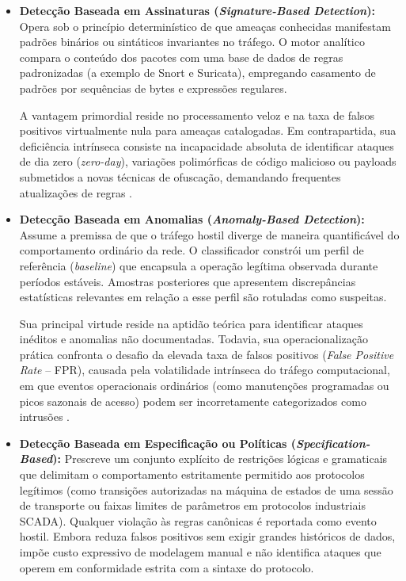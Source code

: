 \begin{itemize}
    \item \textbf{Detecção Baseada em Assinaturas (\emph{Signature-Based Detection}):}
    Opera sob o princípio determinístico de que ameaças conhecidas manifestam padrões binários ou sintáticos invariantes no tráfego. O motor analítico compara o conteúdo dos pacotes com uma base de dados de regras padronizadas (a exemplo de Snort e Suricata), empregando casamento de padrões por sequências de bytes e expressões regulares. 
    
    A vantagem primordial reside no processamento veloz e na taxa de falsos positivos virtualmente nula para ameaças catalogadas. Em contrapartida, sua deficiência intrínseca consiste na incapacidade absoluta de identificar ataques de dia zero (\emph{zero-day}), variações polimórficas de código malicioso ou payloads submetidos a novas técnicas de ofuscação, demandando frequentes atualizações de regras \cite{borgioli2024cae}.

    \item \textbf{Detecção Baseada em Anomalias (\emph{Anomaly-Based Detection}):}
    Assume a premissa de que o tráfego hostil diverge de maneira quantificável do comportamento ordinário da rede. O classificador constrói um perfil de referência (\emph{baseline}) que encapsula a operação legítima observada durante períodos estáveis. Amostras posteriores que apresentem discrepâncias estatísticas relevantes em relação a esse perfil são rotuladas como suspeitas. 
    
    Sua principal virtude reside na aptidão teórica para identificar ataques inéditos e anomalias não documentadas. Todavia, sua operacionalização prática confronta o desafio da elevada taxa de falsos positivos (\emph{False Positive Rate} -- FPR), causada pela volatilidade intrínseca do tráfego computacional, em que eventos operacionais ordinários (como manutenções programadas ou picos sazonais de acesso) podem ser incorretamente categorizados como intrusões \cite{advancedids2024, hsae2025}.

    \item \textbf{Detecção Baseada em Especificação ou Políticas (\emph{Specification-Based}):}
    Prescreve um conjunto explícito de restrições lógicas e gramaticais que delimitam o comportamento estritamente permitido aos protocolos legítimos (como transições autorizadas na máquina de estados de uma sessão de transporte ou faixas limites de parâmetros em protocolos industriais SCADA). Qualquer violação às regras canônicas é reportada como evento hostil. Embora reduza falsos positivos sem exigir grandes históricos de dados, impõe custo expressivo de modelagem manual e não identifica ataques que operem em conformidade estrita com a sintaxe do protocolo.
\end{itemize}

